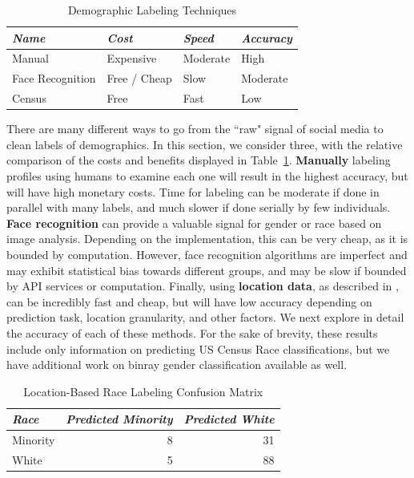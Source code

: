 \begin{table}[h]
\centering
\begin{tabular}{l l l l}
\emph{Name} & \emph{Cost} & \emph{Speed} & \emph{Accuracy} \\ \hline
Manual & Expensive & Moderate & High \\ 
Face Recognition & Free / Cheap & Slow & Moderate \\ 
Census & Free & Fast & Low \\ 
\end{tabular}
\caption{Demographic Labeling Techniques \label{tab:techniques}}
\end{table}

There are many different ways to go from the ``raw" signal of social media to clean labels of demographics.
In this section, we consider three, with the relative comparison of the costs and benefits displayed in Table~\ref{tab:techniques}.
\textbf{Manually} labeling profiles using humans to examine each one will result in the highest accuracy, but will have high monetary costs.
Time for labeling can be moderate if done in parallel with many labels, and much slower if done serially by few individuals. 
\textbf{Face recognition} can provide a valuable signal for gender or race based on image analysis.
Depending on the implementation, this can be very cheap, as it is bounded by computation.
However, face recognition algorithms are imperfect and may exhibit statistical bias towards different groups, and may be slow if bounded by API services or computation.
Finally, using \textbf{location data}, as described in , can be incredibly fast and cheap, but will have low accuracy depending on prediction task, location granularity, and other factors.
We next explore in detail the accuracy of each of these methods.
For the sake of brevity, these results include only information on predicting US Census Race classifications, but we have additional work on binray gender classification available as well.

\begin{table}[h]
\centering
\label{tab:cm_race_loc}
\begin{tabular}{l r r}
\emph{Race} & \emph{Predicted Minority} & \emph{Predicted White} \\ \hline
Minority & 8 & 31 \\
White & 5 & 88 \\
\end{tabular}
\caption{Location-Based Race Labeling Confusion Matrix}
\end{table}

